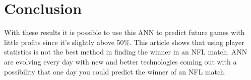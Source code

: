 \documentclass[12pt]{IEEEtran}
\begin{document}
\section{Conclusion}
With these results it is possible to use this ANN to predict future games with little profits since it's slightly above 50\%. This article shows that using player statistics is not the best method in finding the winner in an NFL match. ANN are evolving every day with new and better technologies coming out with a possibility that one day you could predict the winner of an NFL match. 

\newpage


\end{document}
